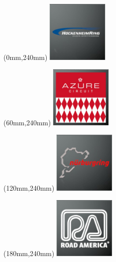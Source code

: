 \begin{textblock*}{30mm}(0mm,240mm)%
\includegraphics[width=30mm]{LG/2015-05-20_00082.png}
\end{textblock*}
\begin{textblock*}{30mm}(60mm,240mm)%
\includegraphics[width=30mm]{LG/2015-05-20_00072.png}
\end{textblock*}
\begin{textblock*}{30mm}(120mm,240mm)%
\includegraphics[width=30mm]{LG/2015-05-20_00088.png}
\end{textblock*}
\begin{textblock*}{30mm}(180mm,240mm)%
\includegraphics[width=30mm]{LG/2015-05-20_00092.png}
\end{textblock*}
